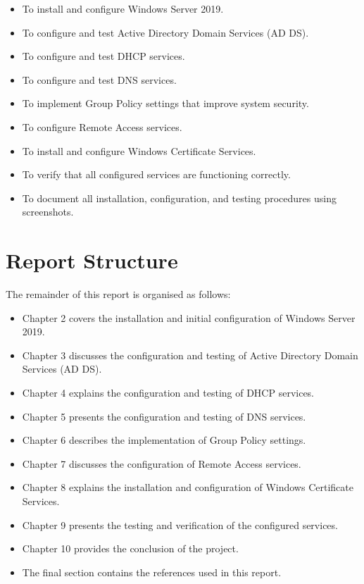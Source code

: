 \begin{itemize}
    \item To install and configure Windows Server 2019.
    \item To configure and test Active Directory Domain Services (AD DS).
    \item To configure and test DHCP services.
    \item To configure and test DNS services.
    \item To implement Group Policy settings that improve system security.
    \item To configure Remote Access services.
    \item To install and configure Windows Certificate Services.
    \item To verify that all configured services are functioning correctly.
    \item To document all installation, configuration, and testing procedures using screenshots.
\end{itemize}

\section{Report Structure}

The remainder of this report is organised as follows:

\begin{itemize}
    \item Chapter 2 covers the installation and initial configuration of Windows Server 2019.
    \item Chapter 3 discusses the configuration and testing of Active Directory Domain Services (AD DS).
    \item Chapter 4 explains the configuration and testing of DHCP services.
    \item Chapter 5 presents the configuration and testing of DNS services.
    \item Chapter 6 describes the implementation of Group Policy settings.
    \item Chapter 7 discusses the configuration of Remote Access services.
    \item Chapter 8 explains the installation and configuration of Windows Certificate Services.
    \item Chapter 9 presents the testing and verification of the configured services.
    \item Chapter 10 provides the conclusion of the project.
    \item The final section contains the references used in this report.
\end{itemize}
